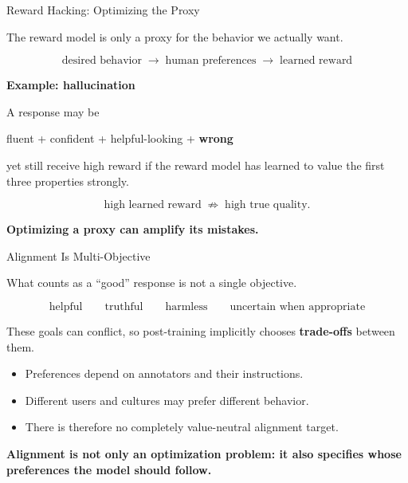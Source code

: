 \documentclass[11pt,compress,t,notes=noshow, xcolor=table]{beamer}
\begin{document}


\begin{vbframe}{Reward Hacking: Optimizing the Proxy}

The reward model is only a proxy for the behavior we actually want.

\[
\text{desired behavior}
\;\longrightarrow\;
\text{human preferences}
\;\longrightarrow\;
\text{learned reward}
\]

\textbf{Example: hallucination}

A response may be

\begin{center}
fluent + confident + helpful-looking + \textbf{wrong}
\end{center}

yet still receive high reward if the reward model
has learned to value the first three properties strongly.

\[
\text{high learned reward}
\;\not\Rightarrow\;
\text{high true quality}.
\]

\begin{center}
\textbf{Optimizing a proxy can amplify its mistakes.}
\end{center}

\end{vbframe}



\begin{vbframe}{Alignment Is Multi-Objective}

What counts as a ``good'' response is not a single objective.

\begin{center}
\[
\text{helpful}
\qquad
\text{truthful}
\qquad
\text{harmless}
\qquad
\text{uncertain when appropriate}
\]
\end{center}

These goals can conflict, so post-training implicitly chooses
\textbf{trade-offs} between them.

\begin{itemize}
    \item Preferences depend on annotators and their instructions.
    \item Different users and cultures may prefer different behavior.
    \item There is therefore no completely value-neutral alignment target.
\end{itemize}

\begin{center}
\textbf{Alignment is not only an optimization problem:
it also specifies whose preferences the model should follow.}
\end{center}

\end{vbframe}
\end{document}
